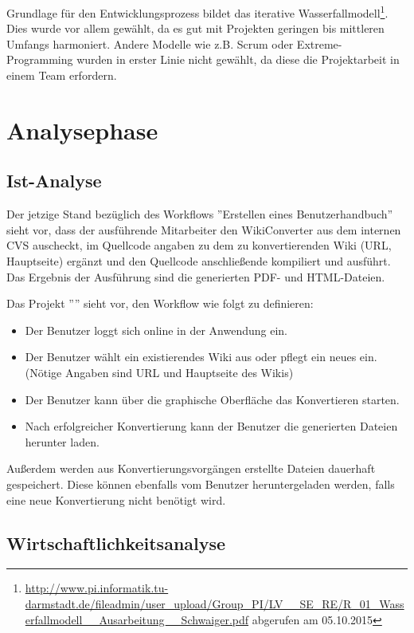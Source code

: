 \documentclass[12pt, xcolor=dvipsnames]{scrartcl}
\begin{document}
Grundlage für den Entwicklungsprozess bildet das iterative Wasserfallmodell\footnote{\url{http://www.pi.informatik.tu-darmstadt.de/fileadmin/user_upload/Group_PI/LV__SE_RE/R_01_Wasserfallmodell__Ausarbeitung__Schwaiger.pdf} abgerufen am 05.10.2015}.
Dies wurde vor allem gewählt, da es gut mit Projekten geringen bis mittleren Umfangs harmoniert. Andere Modelle wie z.B. Scrum oder Extreme-Programming wurden in erster Linie nicht gewählt, da diese die Projektarbeit in einem Team erfordern.

\section{Analysephase}

\subsection{Ist-Analyse}

Der jetzige Stand bezüglich des Workflows ''Erstellen eines Benutzerhandbuch'' sieht vor, dass der ausführende Mitarbeiter den WikiConverter aus dem internen CVS auscheckt, im Quellcode angaben zu dem zu konvertierenden Wiki (URL, Hauptseite) ergänzt und den Quellcode anschließende kompiliert und ausführt. Das Ergebnis der Ausführung sind die generierten PDF- und HTML-Dateien.

Das Projekt ''\Projekt'' sieht vor, den Workflow wie folgt zu definieren:
\begin{itemize}
	\item Der Benutzer loggt sich online in der Anwendung ein.
	\item Der Benutzer wählt ein existierendes Wiki aus oder pflegt ein neues ein. (Nötige Angaben sind URL und Hauptseite des Wikis)
	\item Der Benutzer kann über die graphische Oberfläche das Konvertieren starten.
	\item Nach erfolgreicher Konvertierung kann der Benutzer die generierten Dateien herunter laden.
\end{itemize}

Außerdem werden aus Konvertierungsvorgängen erstellte Dateien dauerhaft gespeichert. Diese können ebenfalls vom Benutzer heruntergeladen werden, falls eine neue Konvertierung nicht benötigt wird.

\subsection{Wirtschaftlichkeitsanalyse}
\end{document}
